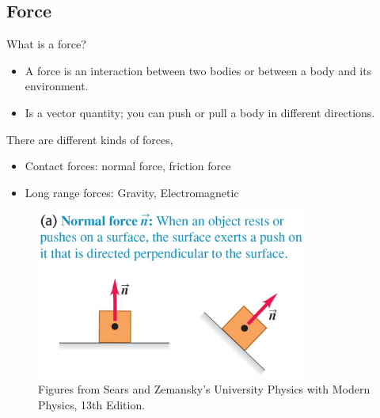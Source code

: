 \documentclass[]{beamer}
\begin{document}
\subsection{Force}

\begin{frame}

What is a force?

\vspace{5mm}
\pause

\begin{itemize}
    \item A force is
    an interaction between two bodies or between a body and its environment.
    \item Is a vector quantity; you can push or pull a body in
    different directions.
\end{itemize}
\vspace{5mm}
\pause


\end{frame}


\begin{frame}

    There are different kinds of forces,
    
    \vspace{5mm}
    \pause
    
    \begin{itemize}
        \item Contact forces: normal force, friction force
        \item Long range forces: Gravity, Electromagnetic
    \end{itemize}
    
  


    
    
    \end{frame}



\begin{frame}

    \begin{figure}[h!]  
        \includegraphics[width=0.8\textwidth]{images/f1.jpg}
        \caption{ {\tiny Figures from Sears and Zemansky's University Physics 
        with Modern Physics, 13th Edition.} }
      \end{figure}
  


    
    
    \end{frame}
\end{document}
